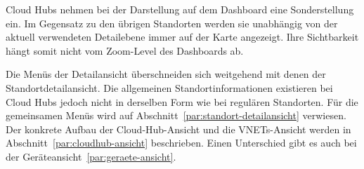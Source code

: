 Cloud Hubs nehmen bei der Darstellung auf dem Dashboard eine Sonderstellung ein.
Im Gegensatz zu den übrigen Standorten werden sie unabhängig von der aktuell
verwendeten Detailebene immer auf der Karte angezeigt. Ihre Sichtbarkeit hängt
somit nicht vom Zoom-Level des Dashboards ab.

Die Menüs der Detailansicht überschneiden sich weitgehend mit denen der
Standortdetailansicht. Die allgemeinen Standortinformationen existieren bei
Cloud Hubs jedoch nicht in derselben Form wie bei regulären Standorten. Für die
gemeinsamen Menüs wird auf Abschnitt~\ref{par:standort-detailansicht} verwiesen.
Der konkrete Aufbau der Cloud-Hub-Ansicht und die VNETs-Ansicht werden in
Abschnitt~\ref{par:cloudhub-ansicht} beschrieben.
Einen Unterschied gibt es auch bei der Geräteansicht~\ref{par:geraete-ansicht}.